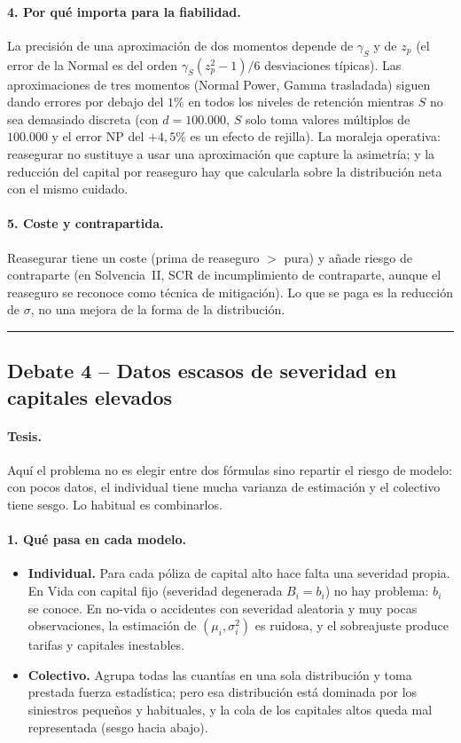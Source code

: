 \documentclass[a4paper,12pt]{article}
\begin{document}
\paragraph{4. Por qu\'e importa para la fiabilidad.} La precisi\'on de una aproximaci\'on de dos momentos depende de $\gamma_S$ y de $z_p$ (el error de la Normal es del orden $\gamma_S(z_p^2-1)/6$ desviaciones t\'ipicas). Las aproximaciones de tres momentos (Normal Power, Gamma trasladada) siguen dando errores por debajo del $1\%$ en todos los niveles de retenci\'on mientras $S$ no sea demasiado discreta (con $d=100.000$, $S$ solo toma valores m\'ultiplos de $100.000$ y el error NP del $+4{,}5\%$ es un efecto de rejilla). La moraleja operativa: reasegurar no sustituye a usar una aproximaci\'on que capture la asimetr\'ia; y la reducci\'on del capital por reaseguro hay que calcularla sobre la distribuci\'on neta con el mismo cuidado.

\paragraph{5. Coste y contrapartida.} Reasegurar tiene un coste (prima de reaseguro $>$ pura) y a\~nade riesgo de contraparte (en Solvencia~II, SCR de incumplimiento de contraparte, aunque el reaseguro se reconoce como t\'ecnica de mitigaci\'on). Lo que se paga es la reducci\'on de $\sigma$, no una mejora de la forma de la distribuci\'on.

\bigskip\hrule\bigskip

\subsection{Debate 4 -- Datos escasos de severidad en capitales elevados}

\paragraph{Tesis.} Aqu\'i el problema no es elegir entre dos f\'ormulas sino repartir el riesgo de modelo: con pocos datos, el individual tiene mucha varianza de estimaci\'on y el colectivo tiene sesgo. Lo habitual es combinarlos.

\paragraph{1. Qu\'e pasa en cada modelo.}
\begin{itemize}[leftmargin=*,itemsep=1pt]
\item \textbf{Individual.} Para cada p\'oliza de capital alto hace falta una severidad propia. En Vida con capital fijo (severidad degenerada $B_i=b_i$) no hay problema: $b_i$ se conoce. En no-vida o accidentes con severidad aleatoria y muy pocas observaciones, la estimaci\'on de $(\mu_i,\sigma_i^2)$ es ruidosa, y el sobreajuste produce tarifas y capitales inestables.
\item \textbf{Colectivo.} Agrupa todas las cuant\'ias en una sola distribuci\'on y toma prestada fuerza estad\'istica; pero esa distribuci\'on est\'a dominada por los siniestros peque\~nos y habituales, y la cola de los capitales altos queda mal representada (sesgo hacia abajo).
\end{itemize}
\end{document}
